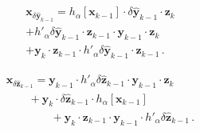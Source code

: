 \documentclass[letterpaper,twocolumn,amsmath,amsfont,amssymb,english,aps,jcp,preprintnumbers,groupaddress,nofootinbib,tightenlines,floatfix]{revtex4}
\newcommand{\mat}[1]{\boldsymbol{#1}}
\theoremstyle{plain}
\theoremstyle{remark}
\theoremstyle{plain}
\begin{document}


\begin{multline}
  \mat{x}_{\delta \widehat{ \mat{y}}_{k-1}} = h_\alpha \left[ \mat{x}_{k-1} \right]  \cdot \delta \widehat{\mat{y}}_{k-1} \cdot \mat{z}_{k} \\
+  h'_\alpha  \delta \widehat{\mat{y}}_{k-1} \cdot \mat{z}_{k-1} \cdot  \mat{y}_{k-1} \cdot  \mat{z}_{k} \\
 + \mat{y}_{k} \cdot \mat{z}_{k-1} \cdot h'_\alpha \delta \widehat{\mat{y}}_{k-1} \cdot \mat{z}_{k-1}  \, .
\end{multline}


\begin{multline}
 \mat{x}_{\delta \widehat{ \mat{z}}_{k-1}} =  {\mat{y}}_{k-1} \cdot  h'_\alpha \delta \widehat{ \mat{z}}_{k-1} \cdot  \mat{y}_{k-1}  \cdot \mat{z}_{k} \\
\qquad + \mat{y}_k \cdot  \delta \widehat{\mat{z}}_{k-1} \cdot   h_\alpha \left[ \mat{x}_{k-1} \right] \\
\qquad \qquad +  \mat{y}_{k} \cdot  \mat{z}_{k-1} \cdot {\mat{y}}_{k-1} \cdot h'_\alpha \delta \widehat{\mat{z}}_{k-1} \, .
\end{multline}
\end{document}
